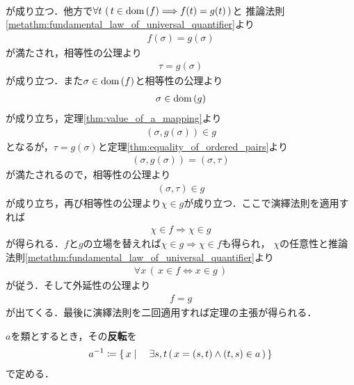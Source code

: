 \begin{prf}
\begin{align}
		\end{align}
		が成り立つ．他方で$\forall t\, \left(\, t \in \operatorname*{dom} \left(f\right) \Longrightarrow f(t) = g(t)\, \right)$と
		推論法則\ref{metathm:fundamental_law_of_universal_quantifier}より
		\begin{align}
			f(\sigma) = g(\sigma)
		\end{align}
		が満たされ，相等性の公理より
		\begin{align}
			\tau = g(\sigma)
		\end{align}
		が成り立つ．また$\sigma \in \operatorname*{dom} \left(f\right)$と相等性の公理より
		\begin{align}
			\sigma \in \operatorname*{dom} \left(g\right)
		\end{align}
		が成り立ち，定理\ref{thm:value_of_a_mapping}より
		\begin{align}
			(\sigma,g(\sigma)) \in g
		\end{align}
		となるが，$\tau = g(\sigma)$と定理\ref{thm:equality_of_ordered_pairs}より
		\begin{align}
			(\sigma,g(\sigma)) = (\sigma,\tau)
		\end{align}
		が満たされるので，相等性の公理より
		\begin{align}
			(\sigma,\tau) \in g
		\end{align}
		が成り立ち，再び相等性の公理より$\chi \in g$が成り立つ．ここで演繹法則を適用すれば
		\begin{align}
			\chi \in f \Longrightarrow \chi \in g
		\end{align}
		が得られる．$f$と$g$の立場を替えれば$\chi \in g \Longrightarrow \chi \in f$も得られ，
		$\chi$の任意性と推論法則\ref{metathm:fundamental_law_of_universal_quantifier}より
		\begin{align}
			\forall x\, (\, x \in f \Longleftrightarrow x \in g\, )
		\end{align}
		が従う．そして外延性の公理より
		\begin{align}
			f = g
		\end{align}
		が出てくる．最後に演繹法則を二回適用すれば定理の主張が得られる．
		\QED
	\end{prf}
	
	\begin{screen}
		\begin{dfn}[反転]
			$a$を類とするとき，その{\bf 反転}を
			\begin{align}
				a^{-1} \coloneqq 
				\left\{\, x \mid \quad \exists s,t\, (\, x=(s,t) \wedge (t,s) \in a\, )\, \right\}
			\end{align}
			で定める．
		\end{dfn}
	\end{screen}
	
